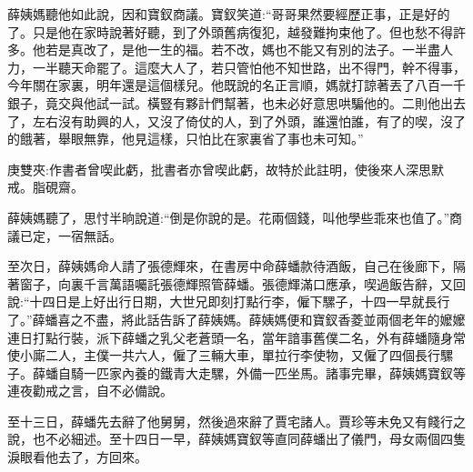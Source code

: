 \begin{parag}
    薛姨媽聽他如此說，因和寶釵商議。寶釵笑道:“哥哥果然要經歷正事，正是好的了。只是他在家時說著好聽，到了外頭舊病復犯，越發難拘束他了。但也愁不得許多。他若是真改了，是他一生的福。若不改，媽也不能又有別的法子。一半盡人力，一半聽天命罷了。這麼大人了，若只管怕他不知世路，出不得門，幹不得事，今年關在家裏，明年還是這個樣兒。他既說的名正言順，媽就打諒著丟了八百一千銀子，竟交與他試一試。橫豎有夥計們幫著，也未必好意思哄騙他的。二則他出去了，左右沒有助興的人，又沒了倚仗的人，到了外頭，誰還怕誰，有了的喫，沒了的餓著，舉眼無靠，他見這樣，只怕比在家裏省了事也未可知。”\begin{note}庚雙夾:作書者曾喫此虧，批書者亦曾喫此虧，故特於此註明，使後來人深思默戒。脂硯齋。\end{note}薛姨媽聽了，思忖半晌說道:“倒是你說的是。花兩個錢，叫他學些乖來也值了。”商議已定，一宿無話。
\end{parag}


\begin{parag}
    至次日，薛姨媽命人請了張德輝來，在書房中命薛蟠款待酒飯，自己在後廊下，隔著窗子，向裏千言萬語囑託張德輝照管薛蟠。張德輝滿口應承，喫過飯告辭，又回說:“十四日是上好出行日期，大世兄即刻打點行李，僱下騾子，十四一早就長行了。”薛蟠喜之不盡，將此話告訴了薛姨媽。薛姨媽便和寶釵香菱並兩個老年的嬤嬤連日打點行裝，派下薛蟠之乳父老蒼頭一名，當年諳事舊僕二名，外有薛蟠隨身常使小廝二人，主僕一共六人，僱了三輛大車，單拉行李使物，又僱了四個長行騾子。薛蟠自騎一匹家內養的鐵青大走騾，外備一匹坐馬。諸事完畢，薛姨媽寶釵等連夜勸戒之言，自不必備說。
\end{parag}


\begin{parag}
    至十三日，薛蟠先去辭了他舅舅，然後過來辭了賈宅諸人。賈珍等未免又有餞行之說，也不必細述。至十四日一早，薛姨媽寶釵等直同薛蟠出了儀門，母女兩個四隻淚眼看他去了，方回來。
\end{parag}


